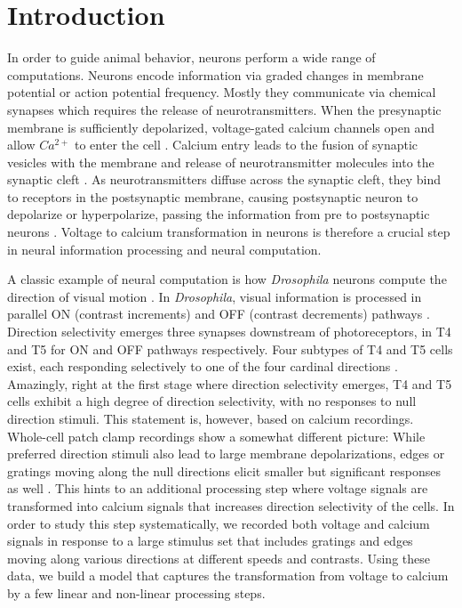 \documentclass[9pt,lineno]{elife}
\begin{document}
\section{Introduction}
In order to guide animal behavior, neurons perform a wide range of computations. Neurons encode information via graded changes in membrane potential or action potential frequency. Mostly they communicate via chemical synapses which requires the release of neurotransmitters. When the presynaptic membrane is sufficiently depolarized, voltage-gated calcium channels open and allow $Ca^{2+}$ to enter the cell \parencite{Luo2020}. Calcium entry leads to the fusion of synaptic vesicles with the membrane and release of neurotransmitter molecules into the synaptic cleft \parencite{Chapman2002}.  As neurotransmitters diffuse across the synaptic cleft, they bind to receptors in the postsynaptic membrane, causing postsynaptic neuron to depolarize or hyperpolarize, passing the information from pre to postsynaptic neurons \parencite{Maio2008}. Voltage to calcium transformation in neurons is therefore a crucial step in neural information processing and neural computation. 

A classic example of neural computation is how \textit{Drosophila} neurons compute the direction of visual motion \parencite{Borst2020}. In \textit{Drosophila}, visual information is processed in parallel ON (contrast increments) and OFF (contrast decrements) pathways \parencite{Joesch2010, Eichner2011}. Direction selectivity emerges three synapses downstream of photoreceptors, in T4 and T5 for ON and OFF pathways respectively. Four subtypes of T4 and T5 cells exist, each responding selectively to one of the four cardinal directions \parencite{Maisak2013}. Amazingly, right at the first stage where direction selectivity emerges, T4 and T5 cells exhibit a high degree of direction selectivity, with no responses to null direction stimuli. This statement is, however, based on calcium recordings. Whole-cell patch clamp recordings show a somewhat different picture: While preferred direction stimuli also lead to large membrane depolarizations, edges or gratings moving along the null directions elicit smaller but significant responses as well \parencite{Groschner2022}. This hints to an additional processing step where voltage signals are transformed into calcium signals that increases direction selectivity of the cells. In order to study this step systematically, we recorded both voltage and calcium signals in response to a large stimulus set that includes gratings and edges moving along various directions at different speeds and contrasts. Using these data, we build a model that captures the transformation from voltage to calcium by a few linear and non-linear processing steps.
\end{document}
